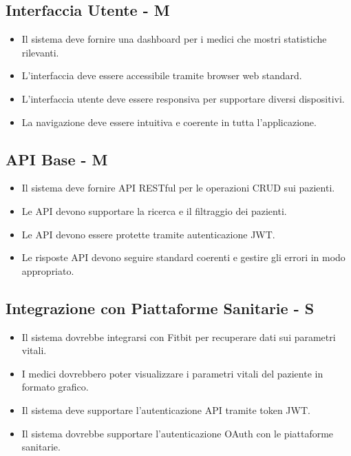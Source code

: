 \documentclass[12pt,a4paper,oneside]{report}
\begin{document}
\subsection{Interfaccia Utente - M}

\begin{itemize}
    \item Il sistema deve fornire una dashboard per i medici che mostri statistiche rilevanti.
    \item L'interfaccia deve essere accessibile tramite browser web standard.
    \item L'interfaccia utente deve essere responsiva per supportare diversi dispositivi.
    \item La navigazione deve essere intuitiva e coerente in tutta l'applicazione.
\end{itemize}

\subsection{API Base - M}

\begin{itemize}
    \item Il sistema deve fornire API RESTful per le operazioni CRUD sui pazienti.
    \item Le API devono supportare la ricerca e il filtraggio dei pazienti.
    \item Le API devono essere protette tramite autenticazione JWT.
    \item Le risposte API devono seguire standard coerenti e gestire gli errori in modo appropriato.
\end{itemize}

\subsection{Integrazione con Piattaforme Sanitarie - S}

\begin{itemize}
    \item Il sistema dovrebbe integrarsi con Fitbit per recuperare dati sui parametri vitali.
    \item I medici dovrebbero poter visualizzare i parametri vitali del paziente in formato grafico.
    \item Il sistema deve supportare l'autenticazione API tramite token JWT.
    \item Il sistema dovrebbe supportare l'autenticazione OAuth con le piattaforme sanitarie.
\end{itemize}
\end{document}
